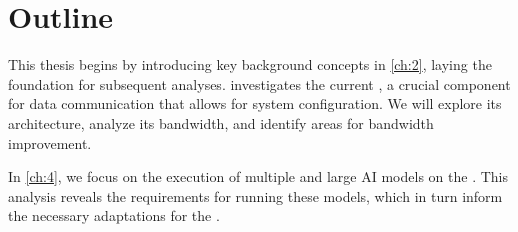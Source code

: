\section{Outline}

This thesis begins by introducing key background concepts in \cref{ch:2}, laying the foundation for subsequent analyses.
 investigates the current \confignoc{}, a crucial component for data communication that allows for system configuration.
We will explore its architecture, analyze its bandwidth, and identify areas for bandwidth improvement.

In \cref{ch:4}, we focus on the execution of multiple and large AI models on the \graicore{}.
This analysis reveals the requirements for running these models, which in turn inform the necessary adaptations for the \confignoc{}.

